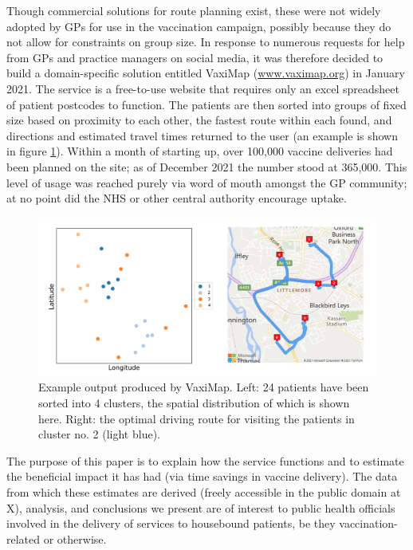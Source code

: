 \documentclass[review]{elsarticle}
\def\vm{VaxiMap}
\begin{document}
Though commercial solutions for route planning exist, these were not widely adopted by GPs for use in the vaccination campaign, possibly because they do not allow for constraints on group size. In response to numerous requests for help from GPs and practice managers on social media, it was therefore decided to build a domain-specific solution entitled \vm{} (\hyperlink{https://www.vaximap.org}{www.vaximap.org}) in January 2021. The service is a free-to-use website that requires only an excel spreadsheet of patient postcodes to function. The patients are then sorted into groups of fixed size based on proximity to each other, the fastest route within each found, and directions and estimated travel times returned to the user (an example is shown in figure \ref{demo}). Within a month of starting up, over 100,000 vaccine deliveries had been planned on the site; as of December 2021 the number stood at 365,000. This level of usage was reached purely via word of mouth amongst the GP community; at no point did the NHS or other central authority encourage uptake. 

\begin{figure}[htbp]
\centering
\includegraphics[width=\textwidth]{demo.png}
\caption{Example output produced by \vm{}. Left: 24 patients have been sorted into 4 clusters, the spatial distribution of which is shown here. Right: the optimal driving route for visiting the patients in cluster no. 2 (light blue).}
\label{demo}
\end{figure}

The purpose of this paper is to explain how the service functions and to estimate the beneficial impact it has had (via time savings in vaccine delivery). The data from which these estimates are derived (freely accessible in the public domain at X), analysis, and conclusions we present are of interest to public health officials involved in the delivery of services to housebound patients, be they vaccination-related or otherwise. 
\end{document}
